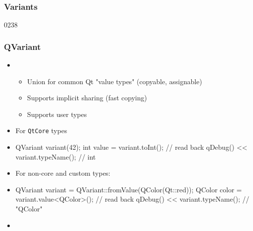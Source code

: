 %
%
%
%

\subsubsection{Variants}

\begin{slide}[fragile]{0238}\frametitle{QVariant}
\begin{itemize}
  \item {} 
  \begin{itemize}
    \item Union for common Qt "value types" (copyable, assignable)
    \item Supports implicit sharing (fast copying)
    \item Supports user types
  \end{itemize}\vspace*{3mm}
  \item For \texttt{QtCore} types  
  \item[] \begin{cpp}
QVariant variant(42);
int value = variant.toInt(); // read back
qDebug() << variant.typeName(); // int
\end{cpp}\vspace*{3mm}
\item For non-core and custom types:
  \item[] \begin{cpp}
QVariant variant = QVariant::fromValue(QColor(Qt::red));
QColor color = variant.value<QColor>(); // read back
qDebug() << variant.typeName(); // "QColor"
\end{cpp}\vspace*{3mm}
\item[] 
\end{itemize}
\end{slide}

